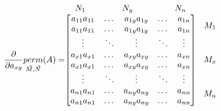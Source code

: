 \documentclass[a4paper]{article}
\theoremstyle{definition}
\begin{document}
\[
  \frac{\partial}{\partial a_{xy}}\underset{\vec{M},\vec{N}}{perm}(A)=
  \stackrel{\mbox{$N_1$ \hspace{14mm}$N_{y}$ \hspace{15mm} $N_{n}$}}{%
    \begin{bmatrix}
      a_{11} a_{11} & \dots  & a_{1y}a_{1y} & \dots  & a_{1n} \\
      a_{11} a_{11} & \dots  & a_{1y}a_{1y} & \dots  & a_{1n} \\
      \vdots        & \ddots & \vdots       & \ddots & \vdots \\
      a_{x1} a_{x1} & \dots  & a_{xy}a_{xy} & \dots  & a_{xn} \\
      a_{x1} a_{x1} & \dots  & a_{xy}a_{xy} & \dots  & a_{xn} \\
      \vdots        & \ddots & \vdots       & \ddots & \vdots \\
      a_{n1} a_{n1} & \dots  & a_{ny}a_{ny} & \dots  & a_{nn} \\
      a_{n1} a_{n1} & \dots  & a_{ny}a_{ny} & \dots  & a_{nn} \\
    \end{bmatrix}%
  }
  \begin{tabular}{ccc}
    $M_1 \vspace{10mm}$ & \\ \vspace{10mm}
    $M_x$               & \\
    $M_{n}$
  \end{tabular}
\]
\end{document}
